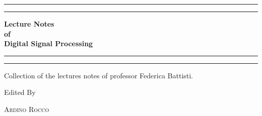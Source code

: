 \begin{titlepage} %

	\centering %

	\scshape %

	\vspace*{\baselineskip} %


	\rule{\textwidth}{1.6pt}\vspace*{-\baselineskip}\vspace*{2pt} %
	\rule{\textwidth}{0.4pt} %

	\vspace{0.75\baselineskip} %

	\textbf{\LARGE Lecture Notes\\ of\\ Digital Signal Processing \\} %

	\vspace{0.75\baselineskip} %

	\rule{\textwidth}{0.4pt}\vspace*{-\baselineskip}\vspace{3.2pt} %
	\rule{\textwidth}{1.6pt} %

	\vspace{2\baselineskip} %

	Collection of the lectures notes of professor Federica Battisti.

	\vspace*{3\baselineskip} %


	Edited By

	\vspace{0.5\baselineskip} %

	{\scshape\Large Ardino Rocco \\} %


\end{titlepage}
